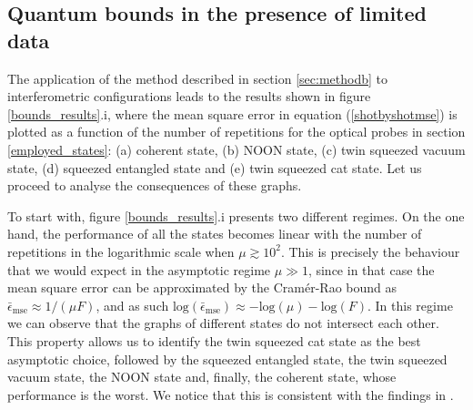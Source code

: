 \subsection{Quantum bounds in the presence of limited data}
\label{main_results}

The application of the method described in section \ref{sec:methodb} to interferometric configurations leads to the results shown in figure \ref{bounds_results}.i, where the mean square error in equation (\ref{shotbyshotmse}) is plotted as a function of the number of repetitions for the optical probes in section \ref{employed_states}: (a) coherent state, (b) NOON state, (c) twin squeezed vacuum state, (d) squeezed entangled state and (e) twin squeezed cat state. Let us proceed to analyse the consequences of these graphs.

To start with, figure \ref{bounds_results}.i presents two different regimes. On the one hand, the performance of all the states becomes linear with the number of repetitions in the logarithmic scale when $\mu \gtrsim 10^2$. This is precisely the behaviour that we would expect in the asymptotic regime $\mu \gg 1$, since in that case the mean square error can be approximated by the Cram\'{e}r-Rao bound as $\bar{\epsilon}_{\mathrm{mse}}\approx 1/(\mu F)$, and as such $\mathrm{log}(\bar{\epsilon}_{\mathrm{mse}}) \approx - \mathrm{log}(\mu) - \mathrm{log}(F)$. In this regime we can observe that the graphs of different states do not intersect each other. This property allows us to identify the twin squeezed cat state as the best asymptotic choice, followed by the squeezed entangled state, the twin squeezed vacuum state, the NOON state and, finally, the coherent state, whose performance is the worst. We notice that this is consistent with the findings in \cite{PaulProctor2016}.

